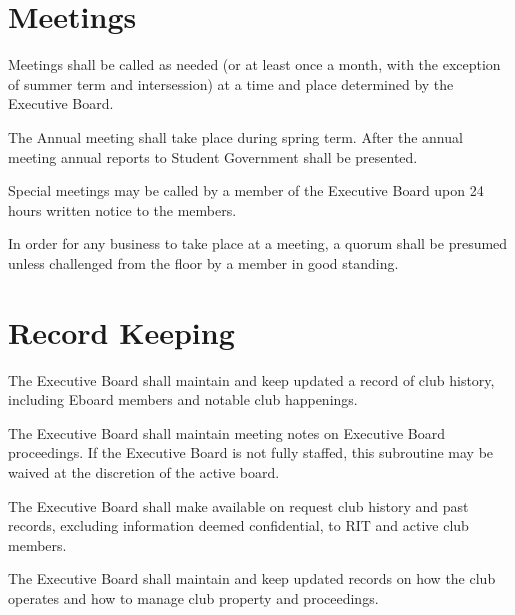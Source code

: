 \section{Meetings}
\begin{subroutines}
\item Meetings shall be called as needed (or at least once a month, with the exception of summer term and intersession) at a time and place determined by the Executive Board.
\item The Annual meeting shall take place during spring term. After the annual meeting annual reports to Student Government shall be presented.
\item Special meetings may be called by a member of the Executive Board upon 24 hours written notice to the members.
\item In order for any business to take place at a meeting, a quorum shall be presumed unless challenged from the floor by a member in good standing.
\end{subroutines}

\section{Record Keeping}
\begin{subroutines}
\item The Executive Board shall maintain and keep updated a record of club history, including Eboard members and notable club happenings.
\item The Executive Board shall maintain meeting notes on Executive Board proceedings. If the Executive Board is not fully staffed, this subroutine may be waived at the discretion of the active board.
\item The Executive Board shall make available on request club history and past records, excluding information deemed confidential, to RIT and active club members.
\item The Executive Board shall maintain and keep updated records on how the club operates and how to manage club property and proceedings.
\end{subroutines}

